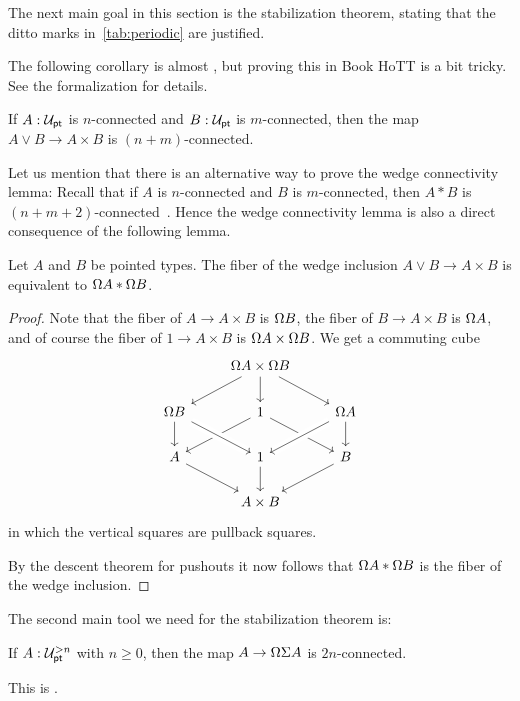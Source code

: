 The next main goal in this section is the stabilization theorem,
stating that the ditto marks in~\cref{tab:periodic} are justified.

The following corollary is almost \cite[Lemma~8.6.2]{hottbook}, but
proving this in Book HoTT is a bit tricky. See the
formalization for details.
\begin{lem}
  \label{lem:wedge-connectivity}
  If $A : \mathcal{U}_{\mathsf{pt}}$ is $n$-connected and $B: \mathcal{U}_{\mathsf{pt}}$ is
  $m$-connected, then the map $A \vee B \to A \times B$ is
  $(n+m)$-connected.
\end{lem}

Let us mention that there is an alternative way to prove the wedge
connectivity lemma: Recall that if $A$ is $n$-connected and $B$ is
$m$-connected, then $A \ast B$ is
$(n+m+2)$-connected~\cite[Theorem~6.8]{joinconstruction}. Hence the
wedge connectivity lemma is also a direct consequence of the following lemma.
\begin{lem}
Let $A$ and $B$ be pointed types.
The fiber of the wedge inclusion $A\vee B\to A\times B$ is equivalent to
$\Omega{A}\ast\Omega{B}$. 
\end{lem}
\begin{proof}
Note that the fiber of $A\to A\times B$ is $\Omega B$, the fiber of $B\to A\times B$ is $\Omega A$, and of course the fiber of $1\to A\times B$ is $\Omega A\times \Omega B$. We get a commuting cube
\begin{equation*}
\begin{tikzcd}
& \loopspacesym A\times \loopspacesym B \arrow[dl] \arrow[d] \arrow[dr] \\
\loopspacesym B \arrow[d] & 1 \arrow[dl] \arrow[dr] & \loopspacesym A \arrow[dl,crossing over] \arrow[d] \\
A \arrow[dr] & 1 \arrow[d] \arrow[from=ul,crossing over] & B \arrow[dl] \\
& A\times B
\end{tikzcd}
\end{equation*}
in which the vertical squares are pullback squares. 

By the descent theorem for pushouts it now follows that $\Omega A\ast \Omega B$ is the fiber of the wedge inclusion.
\end{proof}

The second main tool we need for the stabilization theorem is:
\begin{thm}[Freudenthal]
  If $A : \mathcal{U}_{\mathsf{pt}}^{>n}$ with $n\ge 0$, then the map
  $A \to \Omega\Sigma A$ is $2n$-connected.
\end{thm}
This is \cite[Theorem~8.6.4]{hottbook}.


